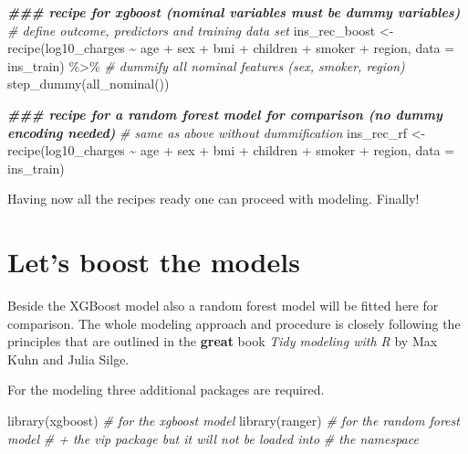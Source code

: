 \documentclass[
]{book}
\newenvironment{Shaded}{\begin{snugshade}}{\end{snugshade}}
\newcommand{\AttributeTok}[1]{\textcolor[rgb]{0.77,0.63,0.00}{#1}}
\newcommand{\CommentTok}[1]{\textcolor[rgb]{0.56,0.35,0.01}{\textit{#1}}}
\newcommand{\DocumentationTok}[1]{\textcolor[rgb]{0.56,0.35,0.01}{\textbf{\textit{#1}}}}
\newcommand{\FunctionTok}[1]{\textcolor[rgb]{0.00,0.00,0.00}{#1}}
\newcommand{\NormalTok}[1]{#1}
\newcommand{\OtherTok}[1]{\textcolor[rgb]{0.56,0.35,0.01}{#1}}
\newcommand{\SpecialCharTok}[1]{\textcolor[rgb]{0.00,0.00,0.00}{#1}}
\begin{document}
\begin{Shaded}
\begin{Highlighting}[]
\DocumentationTok{\#\#\# recipe for xgboost (nominal variables must be dummy variables)}
\CommentTok{\# define outcome, predictors and training data set}
\NormalTok{ins\_rec\_boost }\OtherTok{\textless{}{-}} \FunctionTok{recipe}\NormalTok{(log10\_charges }\SpecialCharTok{\textasciitilde{}}\NormalTok{ age }\SpecialCharTok{+}\NormalTok{ sex }\SpecialCharTok{+}
\NormalTok{                            bmi }\SpecialCharTok{+}\NormalTok{ children }\SpecialCharTok{+}
\NormalTok{                            smoker }\SpecialCharTok{+}\NormalTok{ region,}
                            \AttributeTok{data =}\NormalTok{ ins\_train) }\SpecialCharTok{\%\textgreater{}\%}
  \CommentTok{\# dummify all nominal features (sex, smoker, region)}
  \FunctionTok{step\_dummy}\NormalTok{(}\FunctionTok{all\_nominal}\NormalTok{())}

\DocumentationTok{\#\#\# recipe for a random forest model for comparison (no dummy encoding needed)}
\CommentTok{\# same as above without dummification }
\NormalTok{ins\_rec\_rf }\OtherTok{\textless{}{-}} \FunctionTok{recipe}\NormalTok{(log10\_charges }\SpecialCharTok{\textasciitilde{}}\NormalTok{ age }\SpecialCharTok{+}\NormalTok{ sex }\SpecialCharTok{+}
\NormalTok{                         bmi }\SpecialCharTok{+}\NormalTok{ children }\SpecialCharTok{+}
\NormalTok{                         smoker }\SpecialCharTok{+}\NormalTok{ region,}
                         \AttributeTok{data =}\NormalTok{ ins\_train)}
\end{Highlighting}
\end{Shaded}

Having now all the recipes ready one can proceed with modeling. Finally!

\hypertarget{modeling}{%
\chapter{Let's boost the models}\label{modeling}}

Beside the XGBoost model also a random forest model will be fitted here for comparison. The whole modeling approach and procedure is closely following the principles that are outlined in the \textbf{great} book \emph{Tidy modeling with R} by Max Kuhn and Julia Silge.

For the modeling three additional packages are required.\citep{xgboost_package, ranger_package, vipPack}

\begin{Shaded}
\begin{Highlighting}[]
\FunctionTok{library}\NormalTok{(xgboost) }\CommentTok{\# for the xgboost model}
\FunctionTok{library}\NormalTok{(ranger) }\CommentTok{\# for the random forest model}
\CommentTok{\# + the vip package but it will not be loaded into}
\CommentTok{\# the namespace}
\end{Highlighting}
\end{Shaded}
\end{document}
